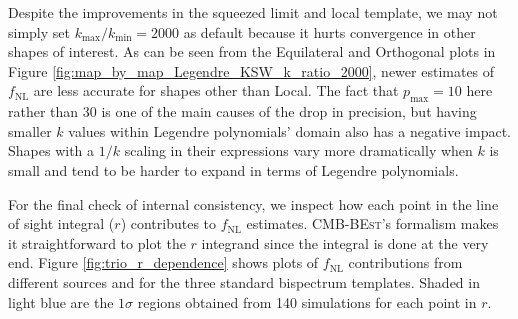Despite the improvements in the squeezed limit and local template, we may not simply set $k_\text{max} / k_\text{min} = 2000$ as default because it hurts convergence in other shapes of interest. As can be seen from the Equilateral and Orthogonal plots in Figure \ref{fig:map_by_map_Legendre_KSW_k_ratio_2000}, newer estimates of $f_\text{NL}$ are less accurate for shapes other than Local. The fact that $p_\text{max}=10$ here rather than $30$ is one of the main causes of the drop in precision, but having smaller $k$ values within Legendre polynomials' domain also has a negative impact. Shapes with a $1/k$ scaling in their expressions vary more dramatically when $k$ is small and tend to be harder to expand in terms of Legendre polynomials.

For the final check of internal consistency, we inspect how each point in the line of sight integral ($r$) contributes to $f_\text{NL}$ estimates. \textsc{CMB-BEst}'s formalism makes it straightforward to plot the $r$ integrand since the integral is done at the very end. Figure \ref{fig:trio_r_dependence} shows plots of $f_\text{NL}$ contributions from different sources and for the three standard bispectrum templates. Shaded in light blue are the $1\sigma$ regions obtained from 140 simulations for each point in $r$.

